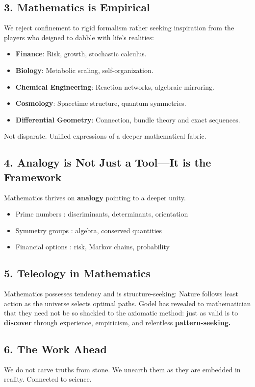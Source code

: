 \subsection*{3. Mathematics is Empirical}
We reject confinement to rigid formalism rather seeking inspiration from the players who deigned to dabble with life's realities:
\begin{itemize}
\item \textbf{Finance}: Risk, growth, stochastic calculus.\item \textbf{Biology}: Metabolic scaling, self-organization.\item \textbf{Chemical Engineering}: Reaction networks, algebraic mirroring.\item \textbf{Cosmology}: Spacetime structure, quantum symmetries.\item \textbf{Differential Geometry}: Connection, bundle theory and exact sequences.\end{itemize}
Not disparate. Unified expressions of a deeper mathematical fabric.

\subsection*{4. Analogy is Not Just a Tool---It is the Framework}
Mathematics thrives on \textbf{analogy} pointing to a deeper unity.\begin{itemize}
\item Prime numbers : discriminants, determinants, orientation\item Symmetry groups : algebra, conserved quantities\item Financial options : risk, Markov chains, probability\end{itemize}

\subsection*{5. Teleology in Mathematics}
Mathematics possesses tendency and is structure-seeking: Nature follows least action as the universe selects optimal paths. Godel has revealed to mathematician that they need not be so shackled to the axiomatic method: just as valid is to \textbf{discover} through experience, empiricism, and relentless \textbf{pattern-seeking.}

\subsection*{6. The Work Ahead}
We do not carve truths from stone. We unearth them as they are embedded in reality. Connected to science.

